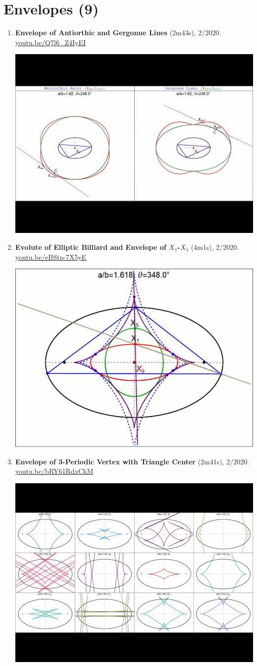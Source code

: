 \documentclass[12pt]{article}
\begin{document}
\section{Envelopes (9)}

\begin{enumerate}[resume]
\item \textbf{Envelope of Antiorthic and Gergonne Lines} (2m43s), 2/2020. \href{https://youtu.be/Q7l6_Z4IyEI}{\url{youtu.be/Q7l6\_Z4IyEI}}
\begin{center}\includegraphics[width=.5\textwidth]{pics/Q7l6_Z4IyEI.jpg}\end{center}
% 
\item \textbf{Evolute of Elliptic Billiard and Envelope of $X_{1}$-$X_{5}$} (4m1s), 2/2020. \href{https://youtu.be/eBStp-7X5yE}{\url{youtu.be/eBStp-7X5yE}}
\begin{center}\includegraphics[width=.5\textwidth]{pics/eBStp-7X5yE.jpg}\end{center}
% 
\item \textbf{Envelope of 3-Periodic Vertex with Triangle Center} (2m41s), 2/2020. \href{https://youtu.be/bRY61RdxCkM}{\url{youtu.be/bRY61RdxCkM}}
\begin{center}\includegraphics[width=.5\textwidth]{pics/bRY61RdxCkM.jpg}\end{center}

\end{enumerate}
\end{document}
